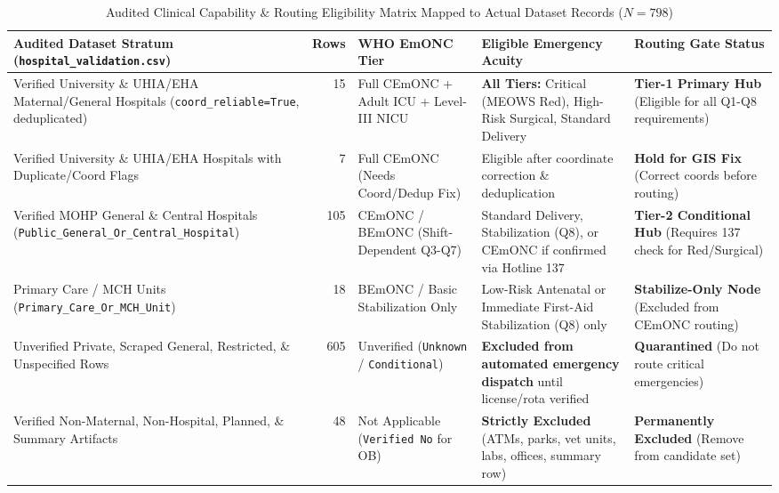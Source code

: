 \documentclass[10pt,a4paper]{article}
\begin{document}
{\scriptsize
\begin{table}[ht!]
\centering
\caption{Audited Clinical Capability \& Routing Eligibility Matrix Mapped to Actual Dataset Records ($N = 798$)}
\label{tab:corrected_matrix}
\begin{tabular}{p{3.9cm} r p{2.9cm} p{4.2cm} p{3.8cm}}
\toprule
\textbf{Audited Dataset Stratum (\texttt{hospital\_validation.csv})} & \textbf{Rows} & \textbf{WHO EmONC Tier} & \textbf{Eligible Emergency Acuity} & \textbf{Routing Gate Status} \\
\midrule
Verified University \& UHIA/EHA Maternal/General Hospitals (\texttt{coord\_reliable=True}, deduplicated) & 15 & Full CEmONC + Adult ICU + Level-III NICU & \textbf{All Tiers:} Critical (MEOWS Red), High-Risk Surgical, Standard Delivery & \textbf{Tier-1 Primary Hub} (Eligible for all Q1-Q8 requirements) \\[0.3em]
Verified University \& UHIA/EHA Hospitals with Duplicate/Coord Flags & 7 & Full CEmONC (Needs Coord/Dedup Fix) & Eligible after coordinate correction \& deduplication & \textbf{Hold for GIS Fix} (Correct coords before routing) \\[0.3em]
Verified MOHP General \& Central Hospitals (\texttt{Public\_General\_Or\_Central\_Hospital}) & 105 & CEmONC / BEmONC (Shift-Dependent Q3-Q7) & Standard Delivery, Stabilization (Q8), or CEmONC if confirmed via Hotline 137 & \textbf{Tier-2 Conditional Hub} (Requires 137 check for Red/Surgical) \\[0.3em]
Primary Care / MCH Units (\texttt{Primary\_Care\_Or\_MCH\_Unit}) & 18 & BEmONC / Basic Stabilization Only & Low-Risk Antenatal or Immediate First-Aid Stabilization (Q8) only & \textbf{Stabilize-Only Node} (Excluded from CEmONC routing) \\[0.3em]
Unverified Private, Scraped General, Restricted, \& Unspecified Rows & 605 & Unverified (\texttt{Unknown} / \texttt{Conditional}) & \textbf{Excluded from automated emergency dispatch} until license/rota verified & \textbf{Quarantined} (Do not route critical emergencies) \\[0.3em]
Verified Non-Maternal, Non-Hospital, Planned, \& Summary Artifacts & 48 & Not Applicable (\texttt{Verified No} for OB) & \textbf{Strictly Excluded} (ATMs, parks, vet units, labs, offices, summary row) & \textbf{Permanently Excluded} (Remove from candidate set) \\
\bottomrule
\end{tabular}
\end{table}
}
\end{document}

